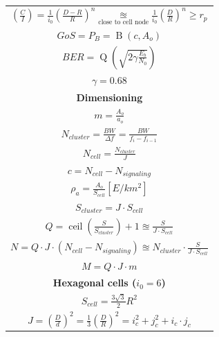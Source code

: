 \documentclass[../main.tex]{subfiles}
\begin{document}
\begin{tabular}{|c|}
	\hline
	$
		\left( \frac{C}{I} \right) = \frac{1}{i_0} \left( \frac {D - R} {R} \right)^n \underset{\text{close to cell node}}{\approxeq} \frac{1}{i_0} \left( \frac {D} {R} \right)^n \ge r_p
	$\\

	$
		GoS = P_B = \operatorname{B}(c, A_o)
	$\\

	$
		BER = \operatorname{Q} \left( \sqrt{2 \gamma \frac{E_b}{N_0}} \right)
	$\\

	$\gamma = 0.68$\\

	\hline
	\textbf{Dimensioning}\\
	\hline

	$
		m = \frac {A_o} {a_o}
	$\\

	$
		N_{cluster} = \frac {BW} {\Delta f} = \frac {BW} {f_{i} -  f_{i-1}}
	$\\

	$
		N_{cell} = \frac {N_{cluster}} {J}
	$\\

	$
		c = N_{cell} - N_{signaling}
	$\\

	$
		\rho_a = \frac {A_o} {S_{cell}} [E / km^2]
	$\\

	$
		S_{cluster} = J \cdot S_{cell}
	$\\

	$
		Q = \operatorname{ceil} \left( \frac {S} {S_{cluster}} \right) + 1 \approxeq \frac {S} {J \cdot S_{cell}}
	$\\

	$
		N = Q \cdot J \cdot (N_{cell} - N_{signaling}) \approxeq N_{cluster} \cdot \frac {S} {J \cdot S_{cell}}
	$\\

	$
		M = Q \cdot J \cdot m
	$\\

	\hline
	\textbf{Hexagonal cells ($i_0 = 6$)}\\
	\hline

	$
		S_{cell} = \frac {3 \sqrt{3}}{2} R^2
	$\\

	$
		J = \left( \frac {D} {d} \right)^2 = \frac{1}{3} \left( \frac{D}{R} \right)^2 = i_{c}^2 + j_{c}^2 + i_{c} \cdot j_{c}
	$\\


\end{tabular}
\end{document}
